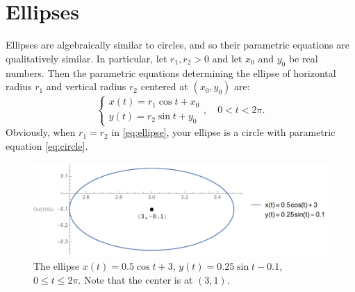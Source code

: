 \documentclass[12pt]{article}
\begin{document}
	\section*{Ellipses}
	Ellipses are algebraically similar to circles, and so their parametric equations are qualitatively similar. In particular, let $r_1,r_2>0$ and let $x_0$ and $y_0$ be real numbers. Then the parametric equations determining the ellipse of horizontal radius $r_1$ and vertical radius $r_2$ centered at $(x_0,y_0)$ are:
	\begin{equation}
	\label{eq:ellipse}
		\left\{
		\begin{array}{l}
		x(t)=r_1\cos{t}+x_0\\
		y(t)=r_2\sin{t}+y_0
		\end{array}
	\right.,\quad 0 < t < 2\pi.\end{equation}
	Obviously, when $r_1=r_2$ in \eqref{eq:ellipse}, your ellipse is a circle with parametric equation \eqref{eq:circle}.
	\begin{figure}[h!]
		\begin{center}
			\includegraphics[trim={15mm 0 55mm 0}, clip, scale=0.7375]{3_Ellipses}
			\caption{The ellipse $x(t)=0.5\cos{t}+3$, $y(t)=0.25\sin{t}-0.1$, $0\leq t\leq 2\pi$. Note that the center is at $(3,1)$.}
		\end{center}
	\end{figure}
\end{document}

